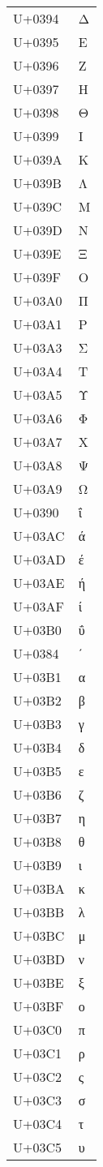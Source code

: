 \documentclass{article}
\begin{document}
\begin{longtable}{ll}
U+0394 & Δ \\
U+0395 & Ε \\
U+0396 & Ζ \\
U+0397 & Η \\
U+0398 & Θ \\
U+0399 & Ι \\
U+039A & Κ \\
U+039B & Λ \\
U+039C & Μ \\
U+039D & Ν \\
U+039E & Ξ \\
U+039F & Ο \\
U+03A0 & Π \\
U+03A1 & Ρ \\
U+03A3 & Σ \\
U+03A4 & Τ \\
U+03A5 & Υ \\
U+03A6 & Φ \\
U+03A7 & Χ \\
U+03A8 & Ψ \\
U+03A9 & Ω \\
U+0390 & ΐ \\
U+03AC & ά \\
U+03AD & έ \\
U+03AE & ή \\
U+03AF & ί \\
U+03B0 & ΰ \\
U+0384 & ΄ \\
U+03B1 & α \\
U+03B2 & β \\
U+03B3 & γ \\
U+03B4 & δ \\
U+03B5 & ε \\
U+03B6 & ζ \\
U+03B7 & η \\
U+03B8 & θ \\
U+03B9 & ι \\
U+03BA & κ \\
U+03BB & λ \\
U+03BC & μ \\
U+03BD & ν \\
U+03BE & ξ \\
U+03BF & ο \\
U+03C0 & π \\
U+03C1 & ρ \\
U+03C2 & ς \\
U+03C3 & σ \\
U+03C4 & τ \\
U+03C5 & υ \\

\end{longtable}
\end{document}
